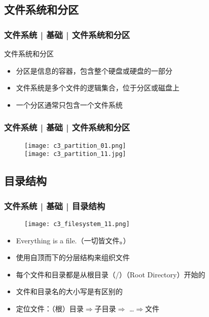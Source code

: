 \subsection{文件系统和分区}
\begin{frame}
  \frametitle{文件系统 | 基础 | 文件系统和分区}
  \begin{block}{文件系统和分区}
    \begin{itemize}
      \item 分区是信息的容器，包含整个硬盘或硬盘的一部分
      \item 文件系统是多个文件的逻辑集合，位于分区或磁盘上
      \item 一个分区通常只包含一个文件系统
    \end{itemize}
  \end{block}
  \begin{figure}
    \centering
  \end{figure}
\end{frame}

\begin{frame}
  \frametitle{文件系统 | 基础 | 文件系统和分区}
  \begin{figure}
    \centering
    \texttt{[image: c3\_partition\_01.png]}\\
    \texttt{[image: c3\_partition\_11.jpg]}
  \end{figure}
\end{frame}

\subsection{目录结构}
\begin{frame}
  \frametitle{文件系统 | 基础 | \alert{目录结构}}
  \begin{figure}
    \centering
    \texttt{[image: c3\_filesystem\_11.png]}
  \end{figure}
  \pause
  \vspace{-0.3cm}
    \begin{itemize}[<+->]
      \item Everything is a file.（一切皆文件。）
      \item 使用自顶而下的分层结构来组织文件
      \item 每个文件和目录都是从根目录（/）（Root Directory）开始的
      \item 文件和目录名的大小写是有区别的
      \item 定位文件：（根）目录$\Rightarrow$子目录$\Rightarrow$ \ldots $\Rightarrow$文件
    \end{itemize}
\end{frame}

